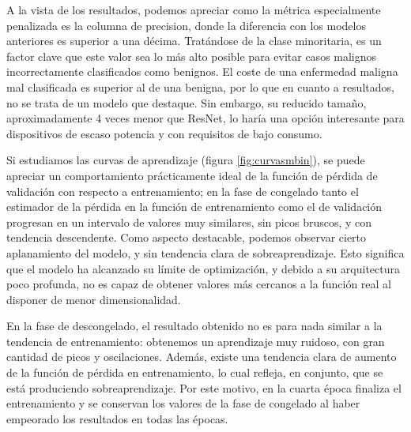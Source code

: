 A la vista de los resultados, podemos apreciar como la métrica especialmente penalizada es la columna de precision, donde la diferencia con los modelos anteriores es superior a una décima. Tratándose de la clase minoritaria, es un factor clave que este valor sea lo más alto posible para evitar casos malignos incorrectamente clasificados como benignos. El coste de una enfermedad maligna mal clasificada es superior al de una benigna, por lo que en cuanto a resultados, no se trata de un modelo que destaque. Sin embargo, su reducido tamaño, aproximadamente 4 veces menor que ResNet, lo haría una opción interesante para dispositivos de escaso potencia y con requisitos de bajo consumo.

Si estudiamos las curvas de aprendizaje (figura \ref{fig:curvasmbin}), se puede apreciar un comportamiento prácticamente ideal de la función  de pérdida de validación con respecto a entrenamiento; en la fase de congelado tanto el estimador de la pérdida en la función de entrenamiento como el de validación progresan en un intervalo de valores muy similares, sin picos bruscos, y con tendencia descendente. Como aspecto destacable, podemos observar cierto aplanamiento del modelo, y sin tendencia clara de sobreaprendizaje. Esto significa que el modelo ha alcanzado su límite de optimización, y debido a su arquitectura poco profunda, no es capaz de obtener valores más cercanos a la función real al disponer de menor dimensionalidad.

En la fase de descongelado, el resultado obtenido no es para nada similar a la tendencia de entrenamiento: obtenemos un aprendizaje muy ruidoso, con gran cantidad de picos y oscilaciones. Además, existe una tendencia clara de aumento de la función de pérdida en entrenamiento, lo cual refleja, en conjunto, que se está produciendo sobreaprendizaje. Por este motivo, en la cuarta época finaliza el entrenamiento y se conservan los valores de la fase de congelado al haber empeorado los resultados en todas las épocas.

